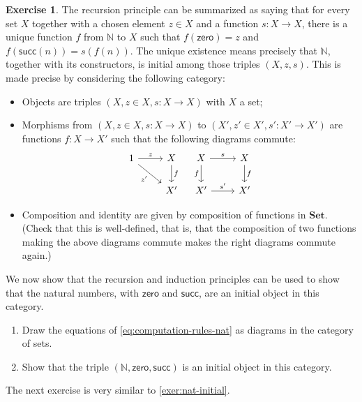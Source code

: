 \documentclass[a4paper,11pt, oneside,titlepage=false]{scrbook}
\theoremstyle{plain}
\theoremstyle{definition}
\newtheorem{exer}[thm]{Exercise}
\newcommand{\Catb}[1]{\mathbf{#1}}
\newcommand{\SET}{\Catb{Set}}
\newcommand{\NN}{\ensuremath{\mathbb{N}}}
\newcommand{\Zero}{\ensuremath{\mathsf{zero}}}
\newcommand{\Succ}{\ensuremath{\mathsf{succ}}}
\begin{document}
\begin{exer}
The recursion principle can be summarized as saying that for every set $X$ together with a chosen element $z \in X$ and a function $s : X \to X$, there is a unique function $f$ from $\NN$ to $X$ such that $f(\Zero) = z$ and $f(\Succ(n)) = s(f(n))$.
The unique existence means precisely that $\NN$, together with its constructors, is initial among those triples $(X, z, s)$.
This is made precise by considering the following category:
\begin{itemize}
\item Objects are triples $(X, z \in X, s : X \to X)$ with $X$ a set;
\item Morphisms from $(X, z \in X, s : X \to X)$ to $(X', z' \in X', s' : X' \to X')$ are functions
  $f : X \to X'$ such that the following diagrams commute:
  \[
    \begin{tikzcd}
      1 \ar[r, "z"] \ar[rd, "z'"']
      &
      X \ar[d, "f"]
      \\
      &
      X'
    \end{tikzcd}
    \quad
    \begin{tikzcd}
      X \ar[r, "s"] \ar[d, "f"']
      &
      X \ar[d, "f"]
      \\
      X' \ar[r, "s'"]
      &
      X'
    \end{tikzcd}
  \]
\item Composition and identity are given by composition of functions in $\SET$.
  (Check that this is well-defined, that is, that the composition of two functions making the above diagrams commute makes the right diagrams commute again.)
\end{itemize}

We now show that the recursion and induction principles can be used to show that the natural numbers, with $\Zero$ and $\Succ$, are an initial object in this category.

\begin{enumerate}
\item Draw the equations of \cref{eq:computation-rules-nat} as diagrams in the category of sets.
\item Show that the triple $(\NN, \Zero, \Succ)$ is an initial object in this category.
\end{enumerate}

\end{exer}

The next exercise is very similar to \cref{exer:nat-initial}.
\end{document}
